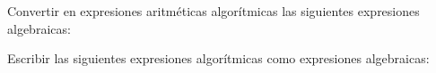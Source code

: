 \documentclass[spanish,addpoints,answers,a4paper]{exam}
\begin{document}
\begin{questions}

\question Convertir en expresiones aritméticas algorítmicas las siguientes expresiones algebraicas:
\begin{multicols}{2}
\end{multicols}

\begin{solution}

\end{solution}

\question Escribir las siguientes expresiones algorítmicas como expresiones algebraicas:
\begin{multicols}{2}
\end{multicols}

\begin{solution}


\end{solution}
\end{questions}
\end{document}
